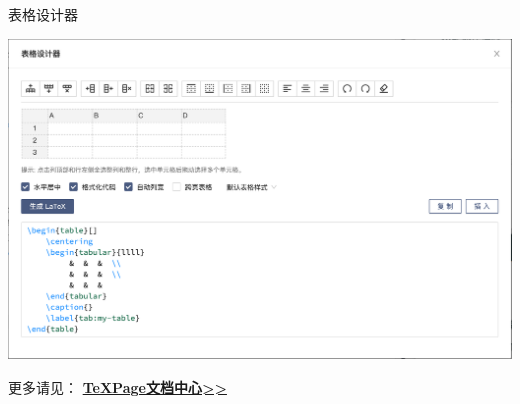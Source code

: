 \documentclass{beamer}
\DeclareRobustCommand\texpage{\TeX Page}
\begin{document}
\begin{frame}{表格设计器}
\begin{center}
    \includegraphics[width=\textwidth]{imgs/table-generator.png}
\end{center}
\end{frame}

\begin{frame}[standout]
\begin{center}
\Large 更多请见：
\href{https://www.texpage.com/docs/}{\textbf{\texpage 文档中心{}>>}}
\end{center}
\end{frame}
\end{document}
